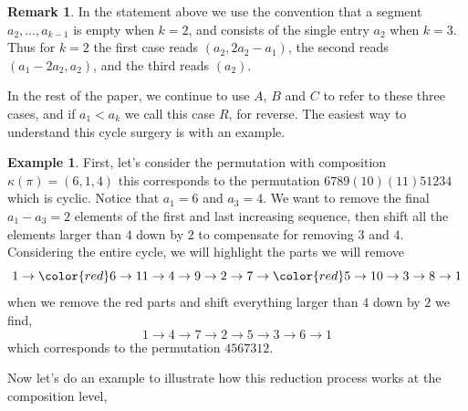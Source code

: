 \documentclass[11pt]{article}
\theoremstyle{definition}
\newtheorem{remark}[theorem]{Remark}
\newtheorem{example}[theorem]{Example}
\begin{document}
\begin{remark}
    In the statement above we use the convention that a segment $a_2,\dots,a_{k-1}$ is empty when $k = 2$, and consists of the single entry $a_2$ when $k = 3$. Thus for $k = 2$ the first case reads $(a_2, 2a_2 - a_1)$, the second reads $(a_1 - 2a_2, a_2)$, and the third reads $(a_2)$.
\end{remark}

    In the rest of the paper, we continue to use $A$, $B$ and $C$ to refer to these three cases, and if $a_1 < a_k$ we call this case $R$, for reverse. The easiest way to understand this cycle surgery is with an example.
    
\begin{example}
     First, let's consider the permutation with composition $\kappa(\pi) = (6,1,4)$ this corresponds to the permutation $6789(10)(11)51234$ which is cyclic. Notice that $a_1 = 6$ and $a_3 = 4$. We want to remove the final $a_1 - a_3 = 2$ elements of the first and last increasing sequence, then shift all the elements larger than $4$ down by $2$ to compensate for removing $3$ and $4$. Considering the entire cycle, we will highlight the parts we will remove
    \[
    1 \to {\color{red} 6 \to 11} \to 4 \to 9 \to 2 \to 7 \to {\color{red} 5 \to 10} \to 3 \to 8 \to 1
    \]
    when we remove the red parts and shift everything larger than $4$ down by $2$ we find,
    \[
    1 \to 4 \to 7 \to 2 \to 5 \to 3 \to 6 \to 1
    \]
    which corresponds to the permutation $4567312$.
\end{example}

Now let's do an example to illustrate how this reduction process works at the composition level,
\end{document}
